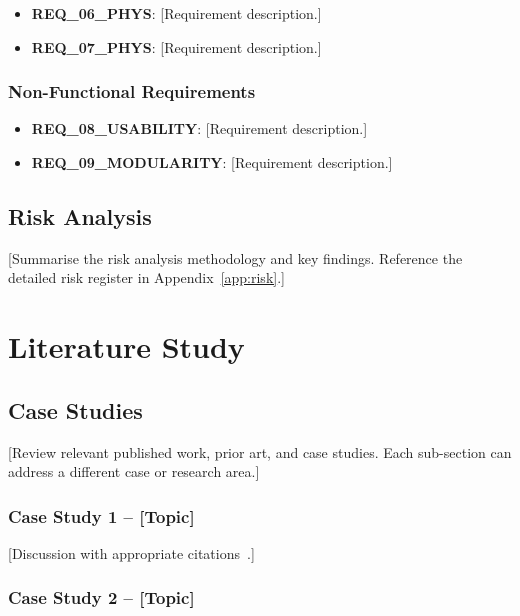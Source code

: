 \documentclass[12pt, a4paper]{report}
\begin{document}
\begin{itemize}
    \item \textbf{REQ\_06\_PHYS}: [Requirement description.]
    \item \textbf{REQ\_07\_PHYS}: [Requirement description.]
\end{itemize}

\subsection{Non-Functional Requirements}
\label{subsec:nonfunc-req}

\begin{itemize}
    \item \textbf{REQ\_08\_USABILITY}: [Requirement description.]
    \item \textbf{REQ\_09\_MODULARITY}: [Requirement description.]
\end{itemize}

\section{Risk Analysis}
\label{sec:risk-analysis}

[Summarise the risk analysis methodology and key findings. Reference
the detailed risk register in Appendix~\ref{app:risk}.]

\chapter{Literature Study}
\label{ch:literature}

\section{Case Studies}
\label{sec:case-studies}

[Review relevant published work, prior art, and case studies. Each
sub-section can address a different case or research area.]

\subsection{Case Study 1 – [Topic]}

[Discussion with appropriate citations~\cite{ref1}.]

\subsection{Case Study 2 – [Topic]}
\end{document}
